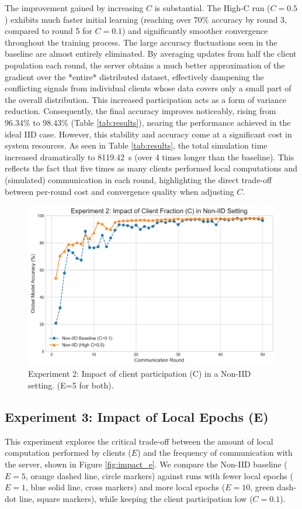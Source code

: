 \documentclass[conference]{IEEEtran}
\begin{document}
The improvement gained by increasing $C$ is substantial. The High-C run ($C=0.5$) exhibits much faster initial learning (reaching over 70\% accuracy by round 3, compared to round 5 for $C=0.1$) and significantly smoother convergence throughout the training process. The large accuracy fluctuations seen in the baseline are almost entirely eliminated. By averaging updates from half the client population each round, the server obtains a much better approximation of the gradient over the *entire* distributed dataset, effectively dampening the conflicting signals from individual clients whose data covers only a small part of the overall distribution. This increased participation acts as a form of variance reduction. Consequently, the final accuracy improves noticeably, rising from 96.34\% to 98.43\% (Table \ref{tab:results}), nearing the performance achieved in the ideal IID case. However, this stability and accuracy come at a significant cost in system resources. As seen in Table \ref{tab:results}, the total simulation time increased dramatically to \SI{8119.42}{s} (over 4 times longer than the baseline). This reflects the fact that five times as many clients performed local computations and (simulated) communication in each round, highlighting the direct trade-off between per-round cost and convergence quality when adjusting $C$.

\begin{figure}[htbp]
  \centering
  \includegraphics[width=0.9\linewidth]{fig_2_impact_of_C} %
  \caption{Experiment 2: Impact of client participation (C) in a Non-IID setting. (E=5 for both).}
  \label{fig:impact_c}
\end{figure}

\subsection{Experiment 3: Impact of Local Epochs (E)}
This experiment explores the critical trade-off between the amount of local computation performed by clients ($E$) and the frequency of communication with the server, shown in Figure \ref{fig:impact_e}. We compare the Non-IID baseline ($E=5$, orange dashed line, circle markers) against runs with fewer local epochs ($E=1$, blue solid line, cross markers) and more local epochs ($E=10$, green dash-dot line, square markers), while keeping the client participation low ($C=0.1$).
\end{document}
